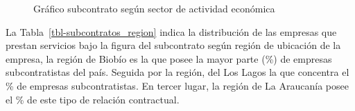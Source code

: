 \documentclass[
  11pt,
]{article}
\begin{document}
\begin{figure}[H]

\caption{\label{fig-subcontratos_sector}Gráfico subcontrato según sector
de actividad económica}


\end{figure}%

La Tabla~\ref{tbl-subcontratos_region} indica la distribución de las
empresas que prestan servicios bajo la figura del subcontrato según
región de ubicación de la empresa, la región de Biobío es la que posee
la mayor parte (\%) de empresas subcontratistas del país.
Seguida por la región, del Los Lagos la que concentra el \% de
empresas subcontratistas. En tercer lugar, la región de La Araucanía
posee el \% de este tipo de relación contractual.
\end{document}
